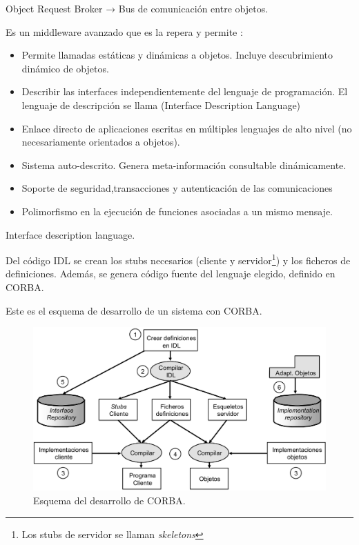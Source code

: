 \begin{defn}[ORB]
Object Request Broker → Bus de comunicación entre objetos.

Es un middleware avanzado que es la repera y permite :

\begin{itemize}
	\item Permite llamadas estáticas y dinámicas a objetos. Incluye descubrimiento dinámico de objetos.
	\item Describir las interfaces independientemente del lenguaje de programación. El lenguaje de descripción se llama \label{IDL} (Interface Description Language)
	\item Enlace directo de aplicaciones escritas en múltiples lenguajes de alto nivel (no necesariamente orientados a objetos).
	\item Sistema auto-descrito. Genera meta-información consultable dinámicamente.
	\item Soporte de seguridad,transacciones y autenticación de las comunicaciones
	\item Polimorfismo en la ejecución de funciones asociadas a un mismo mensaje.
\end{itemize}
\end{defn}

\begin{defn}[IDL]
Interface description language.
\end{defn}

Del código IDL se crean los stubs necesarios (cliente y servidor\footnote{Los stubs de servidor se llaman \textit{skeletons}}) y los ficheros de definiciones. Además, se genera código fuente del lenguaje elegido, definido en CORBA.

Este es el esquema de desarrollo de un sistema con CORBA.


\begin{figure}[hbtp]
\centering
\includegraphics[width=1\textwidth]{img/CORBA.png}
\caption{Esquema del desarrollo de CORBA.}
\label{OMA}
\end{figure}


